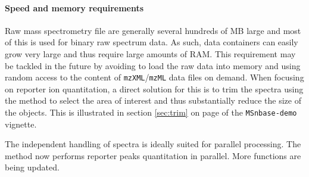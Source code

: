 \paragraph{Speed and memory requirements} Raw mass spectrometry file are generally several 
hundreds of MB large and most of this is used for binary raw spectrum data. As such, 
data containers can easily grow very large and thus require large amounts of RAM. 
This requirement may be tackled in the future by avoiding to load the raw data into memory
and using random access to the content of \texttt{mzXML}/\texttt{mzML} data files on demand. 
When focusing on reporter ion quantitation, a direct solution for this is to trim the 
spectra using the  method to select the area of interest and thus 
substantially reduce the size of the  objects. This is illustrated in 
section \ref{sec:trim} on page \pageref{trimMz-example} of the \texttt{MSnbase-demo} vignette.

The independent handling of spectra is ideally suited for parallel processing. 
The  method now performs reporter peaks quantitation in parallel. 
More functions are being updated.




